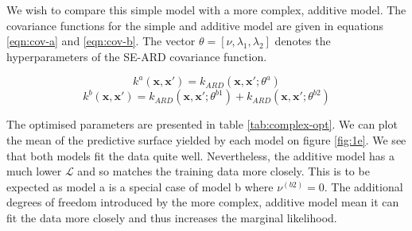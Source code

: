 \documentclass[]{article}
\newcommand{\Lcal}{\mathcal{L}}
\begin{document}
We wish to compare this simple model with a more complex, additive model. The covariance functions for the simple and additive model are given in equations \ref{eqn:cov-a} and \ref{eqn:cov-b}. The vector $\theta = [\nu, \lambda_1, \lambda_2]$ denotes the hyperparameters of the SE-ARD covariance function.

\begin{equation}
k^a(\mathbf{x}, \mathbf{x}') = k_{ARD}(\mathbf{x}, \mathbf{x}' ; \theta^a)
\label{eqn:cov-a}
\end{equation}
\begin{equation}
k^b(\mathbf{x}, \mathbf{x}') = k_{ARD}(\mathbf{x}, \mathbf{x}' ; \theta^{b1})
+ k_{ARD}(\mathbf{x}, \mathbf{x}' ; \theta^{b2})
\label{eqn:cov-b}
\end{equation}

The optimised parameters are presented in table \ref{tab:complex-opt}. We can plot the mean of the predictive surface yielded by each model on figure \ref{fig:1e}. We see that both models fit the data quite well. Nevertheless, the additive model has a much lower $\Lcal$ and so matches the training data more closely. This is to be expected as model a is a special case of model b where $\nu^{(b2)}=0$. The additional degrees of freedom introduced by the more complex, additive model mean it can fit the data more closely and thus increases the marginal likelihood.
\end{document}
